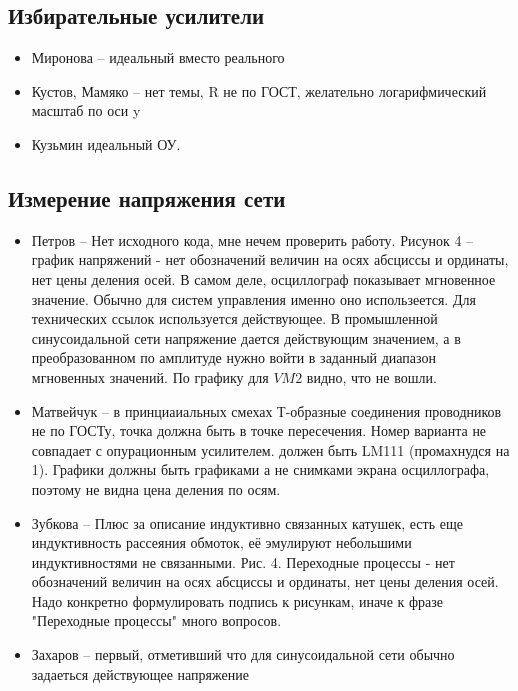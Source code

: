 \subsection*{Избирательные усилители}
\begin{itemize}
\item Миронова -- идеальный вместо реального
\item Кустов, Мамяко -- нет темы, R не по ГОСТ, желательно логарифмический масштаб по оси y
\item Кузьмин идеальный ОУ.
\end{itemize}

\subsection*{Измерение напряжения сети}
\begin{itemize}
\item Петров -- Нет исходного кода, мне нечем проверить работу. Рисунок 4 -- график напряжений - нет обозначений величин на осях абсциссы и ординаты, нет цены деления осей.
В самом деле, осциллограф показывает мгновенное значение. Обычно для систем управления именно оно использеется. Для технических ссылок используется действующее.
В промышленной синусоидальной сети напряжение дается действующим значением,
а в преобразованном по амплитуде нужно войти в заданный диапазон мгновенных значений. По графику для $VM2$ видно, что не вошли. 
\item Матвейчук  -- в принциаиальных смехах Т-образные соединения проводников не по ГОСТу, точка должна быть в точке пересечения. Номер варианта не совпадает с опурационным усилителем.
должен быть LM111 (промахнудся на 1). Графики должны быть графиками а не снимками экрана осциллографа, поэтому не видна цена деления по осям.

\item Зубкова -- Плюс за описание индуктивно связанных катушек, есть еще индуктивность рассеяния обмоток, её эмулируют небольшими индуктивностями не связанными.
Рис. 4. Переходные процессы - нет обозначений величин на осях абсциссы и ординаты, нет цены деления осей.
Надо конкретно формулировать подпись к рисункам, иначе  к фразе "Переходные процессы" много вопросов.


\item Захаров -- первый, отметивший что для синусоидальной сети обычно задаеться действующее напряжение


\end{itemize}
